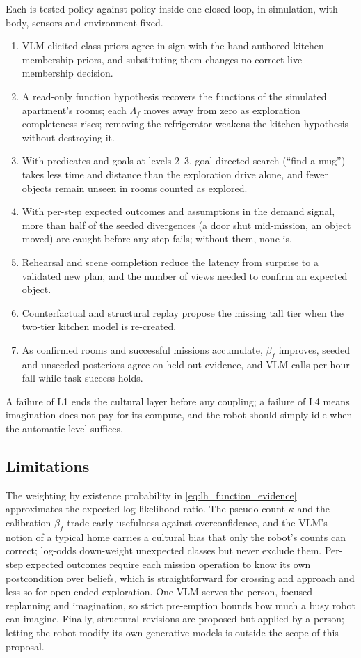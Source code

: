Each is tested policy against policy inside one closed loop, in simulation, with body, sensors and environment fixed.
\begin{enumerate}[label=\textbf{L\arabic*}, start=0]
    \item VLM-elicited class priors agree in sign with the hand-authored kitchen membership priors, and substituting
    them changes no correct live membership decision.
    \item A read-only function hypothesis recovers the functions of the simulated apartment's rooms; each
    $\Lambda_f$ moves away from zero as exploration completeness rises; removing the refrigerator weakens the kitchen
    hypothesis without destroying it.
    \item With predicates and goals at levels 2--3, goal-directed search (``find a mug'') takes less time and distance
    than the exploration drive alone, and fewer objects remain unseen in rooms counted as explored.
    \item With per-step expected outcomes and assumptions in the demand signal, more than half of the seeded
    divergences (a door shut mid-mission, an object moved) are caught before any step fails; without them, none is.
    \item Rehearsal and scene completion reduce the latency from surprise to a validated new plan, and the number of
    views needed to confirm an expected object.
    \item Counterfactual and structural replay propose the missing tall tier when the two-tier kitchen model is
    re-created.
    \item As confirmed rooms and successful missions accumulate, $\beta_f$ improves, seeded and unseeded posteriors agree
    on held-out evidence, and VLM calls per hour fall while task success holds.
\end{enumerate}
A failure of L1 ends the cultural layer before any coupling; a failure of L4 means imagination does not pay for its
compute, and the robot should simply idle when the automatic level suffices.

\subsection{Limitations}
\label{sec:lang_hierarchy:limitations}

The weighting by existence probability in \eqref{eq:lh_function_evidence} approximates the expected log-likelihood
ratio. The pseudo-count $\kappa$ and the calibration $\beta_f$ trade early usefulness against overconfidence, and
the VLM's notion of a typical home carries a cultural bias that only the robot's counts can correct; log-odds
down-weight unexpected classes but never exclude them. Per-step expected outcomes require each mission operation to
know its own postcondition over beliefs, which is straightforward for crossing and approach and less so for
open-ended exploration. One VLM serves the person, focused replanning and imagination, so strict pre-emption bounds
how much a busy robot can imagine. Finally, structural revisions are proposed but applied by a person; letting the
robot modify its own generative models is outside the scope of this proposal.
